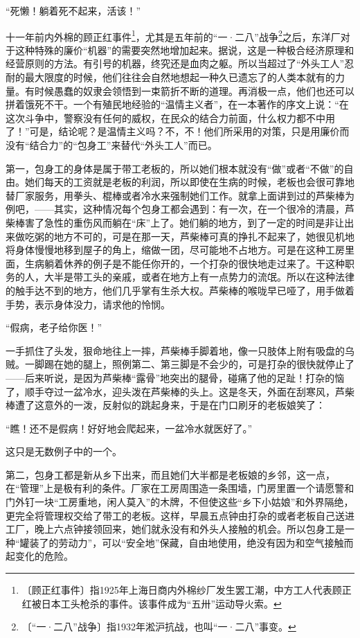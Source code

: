 \documentclass[12pt,UTF-8,openany]{ctexbook}
\begin{document}
\begin{normalsize}
    “死懒！躺着死不起来，活该！”
    
    十一年前内外棉的顾正红事件\footnote{〔顾正红事件〕指1925年上海日商内外棉纱厂发生罢工潮，中方工人代表顾正红被日本工头枪杀的事件。该事件成为“五卅”运动导火索。}，尤其是五年前的“一·二八”战争\footnote{〔“一·二八”战争〕指1932年淞沪抗战，也叫“一·二八”事变。}之后，东洋厂对于这种特殊的廉价“机器”的需要突然地增加起来。据说，这是一种极合经济原理和经营原则的方法。有引号的机器，终究还是血肉之躯。所以当超过了“外头工人”忍耐的最大限度的时候，他们往往会自然地想起一种久已遗忘了的人类本就有的力量。有时候愚蠢的奴隶会领悟到一束箭折不断的道理。再消极一点，他们也还可以拼着饿死不干。一个有殖民地经验的“温情主义者”，在一本著作的序文上说：“在这次斗争中，警察没有任何的威权，在民众的结合力前面，什么权力都不中用了！”可是，结论呢？是温情主义吗？不，不！他们所采用的对策，只是用廉价而没有“结合力”的“包身工”来替代“外头工人”而已。
    
    第一，包身工的身体是属于带工老板的，所以她们根本就没有“做”或者“不做”的自由。她们每天的工资就是老板的利润，所以即使在生病的时候，老板也会很可靠地替厂家服务，用拳头、棍棒或者冷水来强制她们工作。就拿上面讲到过的芦柴棒为例吧，——其实，这种情况每个包身工都会遇到：有一次，在一个很冷的清晨，芦柴棒害了急性的重伤风而躺在“床”上了。她们躺的地方，到了一定的时间是非让出来做吃粥的地方不可的，可是在那一天，芦柴棒可真的挣扎不起来了，她很见机地将身体慢慢地移到屋子的角上，缩做一团，尽可能地不占地方。可是在这种工房里面，生病躺着休养的例子是不能任你开的，一个打杂的很快地走过来了。干这种职务的人，大半是带工头的亲戚，或者在地方上有一点势力的流氓。所以在这种法律的触手达不到的地方，他们几乎掌有生杀大权。芦柴棒的喉咙早已哑了，用手做着手势，表示身体没力，请求他的怜悯。
    
    “假病，老子给你医！”
    
    一手抓住了头发，狠命地往上一摔，芦柴棒手脚着地，像一只肢体上附有吸盘的乌贼。一脚踢在她的腿上，照例第二、第三脚是不会少的，可是打杂的很快就停止了——后来听说，是因为芦柴棒“露骨”地突出的腿骨，碰痛了他的足趾！打杂的恼了，顺手夺过一盆冷水，迎头泼在芦柴棒的头上。这是冬天，外面在刮寒风，芦柴棒遭了这意外的一泼，反射似的跳起身来，于是在门口刷牙的老板娘笑了：
    
    “瞧！还不是假病！好好地会爬起来，一盆冷水就医好了。”
    
    这只是无数例子中的一个。
    
    第二，包身工都是新从乡下出来，而且她们大半都是老板娘的乡邻，这一点，在“管理”上是极有利的条件。厂家在工房周围造一条围墙，门房里置一个请愿警和门外钉一块“工房重地，闲人莫入”的木牌，不但使这些“乡下小姑娘”和外界隔绝，更完全将管理权交给了带工的老板。这样，早晨五点钟由打杂的或者老板自己送进工厂，晚上六点钟接领回来，她们就永没有和外头人接触的机会。所以包身工是一种“罐装了的劳动力”，可以“安全地”保藏，自由地使用，绝没有因为和空气接触而起变化的危险。
    

\end{normalsize}
\end{document}
